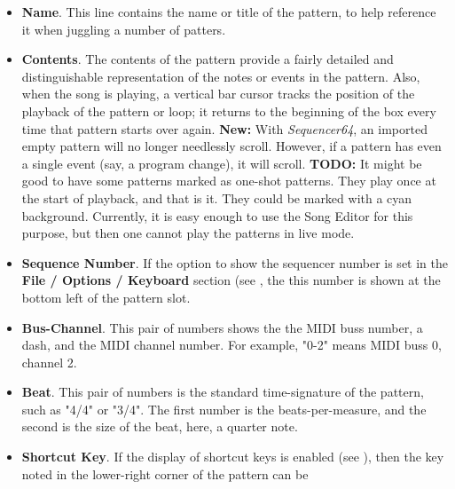    \begin{itemize}
      \item \textbf{Name}.
         This line contains the name or title of the pattern, to help
         reference it when juggling a number of patters.
      \item \textbf{Contents}.
         The contents of the pattern provide a fairly detailed and
         distinguishable representation of the notes or events in the
         pattern.  Also, when the song is playing, a vertical bar cursor
         tracks the position of the playback of the pattern or loop; it
         returns to the beginning of the box every time that pattern starts
         over again.
         \textbf{New:}
         With \textsl{Sequencer64}, an imported empty pattern will no longer
         needlessly scroll.
         However, if a pattern has even a single event (say, a program change),
         it will scroll.
         \textbf{TODO:}
         It might be good to have some patterns marked as one-shot patterns.
         They play once at the start of playback, and that is it.
         They could be marked with a cyan background.
         Currently, it is easy enough to use the Song Editor for this purpose,
         but then one cannot play the patterns in live mode.
      \item \textbf{Sequence Number}.
         If the option to show the sequencer number is set
         in the \textbf{File / Options / Keyboard} section
         (see ,
         the this number is shown at the bottom left of the pattern slot.
      \item \textbf{Bus-Channel}.
         This pair of numbers shows the the MIDI buss number, a dash, and
         the MIDI channel number.
         For example, "0-2" means MIDI buss 0, channel 2.
      \item \textbf{Beat}.
         This pair of numbers is the standard time-signature of the pattern,
         such as "4/4" or "3/4".  The first number is the beats-per-measure,
         and the second is the size of the beat, here, a quarter note.
      \item \textbf{Shortcut Key}.
         If the display of shortcut keys is enabled (see
         ),
         then the key noted in the lower-right corner of the pattern can be

\end{itemize}
